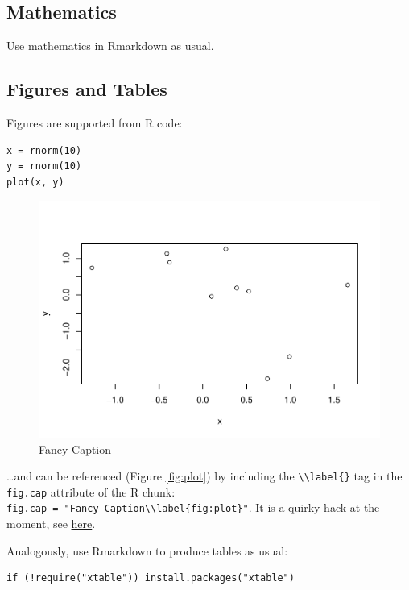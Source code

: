 \documentclass[Royal,times,sageh]{sagej}
\begin{document}
\hypertarget{mathematics}{%
\subsection{Mathematics}\label{mathematics}}

Use mathematics in Rmarkdown as usual.

\hypertarget{figures-and-tables}{%
\subsection{Figures and Tables}\label{figures-and-tables}}

Figures are supported from R code:

\begin{verbatim}
x = rnorm(10)
y = rnorm(10)
plot(x, y)
\end{verbatim}

\begin{figure}
\includegraphics[width=1\linewidth]{Untitled_files/figure-latex/plot-ref-1} \caption{Fancy Caption\label{fig:plot}}\label{fig:plot-ref}
\end{figure}

\ldots and can be referenced (Figure \ref{fig:plot}) by including the
\texttt{\textbackslash{}\textbackslash{}label\{\}} tag in the
\texttt{fig.cap} attribute of the R chunk:
\texttt{fig.cap\ =\ "Fancy\ Caption\textbackslash{}\textbackslash{}label\{fig:plot\}"}.
It is a quirky hack at the moment, see
\href{https://github.com/yihui/knitr/issues/323}{here}.

Analogously, use Rmarkdown to produce tables as usual:

\begin{verbatim}
if (!require("xtable")) install.packages("xtable")
\end{verbatim}
\end{document}
